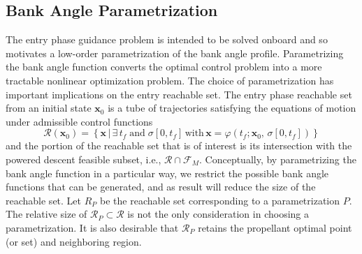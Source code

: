 \documentclass[letterpaper, paper,11pt]{AAS}
\begin{document}
\subsection{Bank Angle Parametrization}
The entry phase guidance problem is intended to be solved onboard and so motivates a low-order parametrization of the bank angle profile. Parametrizing the bank angle function converts the optimal control problem into a more tractable nonlinear optimization problem. The choice of parametrization has important implications on the entry reachable set. The entry phase reachable set from an initial state $ \mathbf{x}_0$ is a tube of trajectories satisfying the equations of motion under admissible control functions 
\begin{equation*}
\mathcal{R}(\mathbf{x}_0)=\left\{\mathbf{x} \,| \,\exists\, t_f \;\mathrm{and}\; \sigma[0, t_f] \,\mathrm{with}\, \mathbf{x} = \varphi(t_f;\mathbf{x}_0,\, \sigma[0, t_f])  \right\}
\end{equation*}
and the portion of the reachable set that is of interest is its intersection with the powered descent feasible subset, i.e., $\mathcal{R} \cap \mathcal{F}_M$. Conceptually, by parametrizing the bank angle function in a particular way, we restrict the possible bank angle functions that can be generated, and as result will reduce the size of the reachable set. Let $R_P$ be the reachable set corresponding to a parametrization $ P $.
The relative size of $\mathcal{R}_P \subset \mathcal{R}$ is not the only consideration in choosing a parametrization. 
It is also desirable that $\mathcal{R}_P$ retains the propellant optimal point (or set) and neighboring region. 
\end{document}
